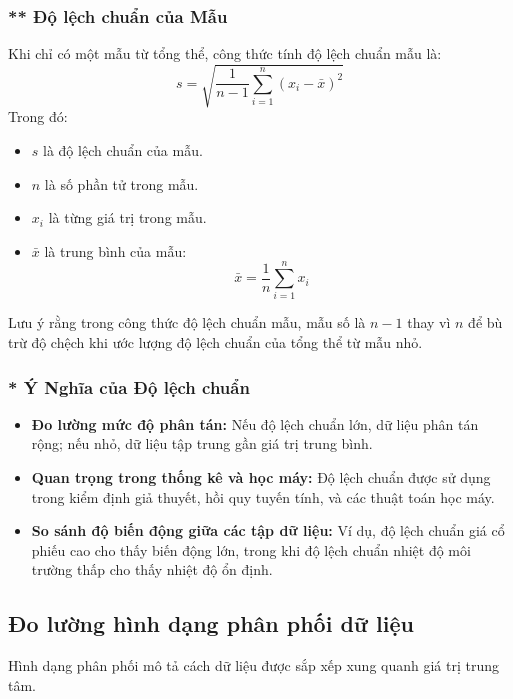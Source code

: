 \subsubsection{** Độ lệch chuẩn của Mẫu}
Khi chỉ có một mẫu từ tổng thể, công thức tính độ lệch chuẩn mẫu là:
\begin{equation}
    s = \sqrt{\frac{1}{n-1} \sum_{i=1}^{n} (x_i - \bar{x})^2}
\end{equation}
Trong đó:
\begin{itemize}
    \item $s$ là độ lệch chuẩn của mẫu.
    \item $n$ là số phần tử trong mẫu.
    \item $x_i$ là từng giá trị trong mẫu.
    \item $\bar{x}$ là trung bình của mẫu:
    \begin{equation}
        \bar{x} = \frac{1}{n} \sum_{i=1}^{n} x_i
    \end{equation}
\end{itemize}

Lưu ý rằng trong công thức độ lệch chuẩn mẫu, mẫu số là $n-1$ thay vì $n$ để bù trừ độ chệch khi ước lượng độ lệch chuẩn của tổng thể từ mẫu nhỏ.

\subsubsection*{* Ý Nghĩa của Độ lệch chuẩn}
\begin{itemize}
    \item \textbf{Đo lường mức độ phân tán:} Nếu độ lệch chuẩn lớn, dữ liệu phân tán rộng; nếu nhỏ, dữ liệu tập trung gần giá trị trung bình.
    \item \textbf{Quan trọng trong thống kê và học máy:} Độ lệch chuẩn được sử dụng trong kiểm định giả thuyết, hồi quy tuyến tính, và các thuật toán học máy.
    \item \textbf{So sánh độ biến động giữa các tập dữ liệu:} Ví dụ, độ lệch chuẩn giá cổ phiếu cao cho thấy biến động lớn, trong khi độ lệch chuẩn nhiệt độ môi trường thấp cho thấy nhiệt độ ổn định.
\end{itemize}




\subsection{Đo lường hình dạng phân phối dữ liệu}
Hình dạng phân phối mô tả cách dữ liệu được sắp xếp xung quanh giá trị trung tâm.

